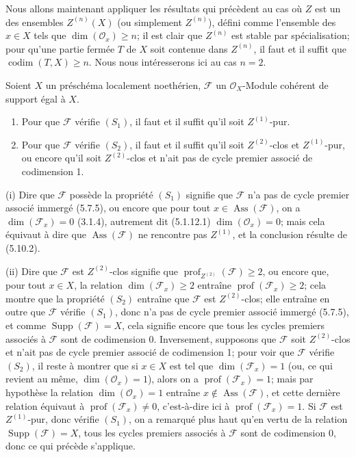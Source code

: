 \begin{env}[5.10.13]
\label{IV.2.s5.10.13-fr}
Nous allons maintenant appliquer les résultats qui précèdent au cas où $Z$ est
un des ensembles $Z^{(n)}(X)$ (ou simplement $Z^{(n)}$), défini comme
l'ensemble des $x\in X$ tels que $\dim(\mathcal O_x)\geq n$; il est clair que
$Z^{(n)}$ est stable par spécialisation; pour qu'une partie fermée $T$ de $X$
soit contenue dans $Z^{(n)}$, il faut et il suffit que
$\operatorname{codim}(T,X)\geq n$. Nous nous intéresserons ici au cas $n=2$.
\end{env}

\begin{proposition}[5.10.14]
\label{IV.2.s5.10.14-fr}
Soient $X$ un préschéma localement noethérien, $\mathcal F$ un
$\mathcal O_X$-Module cohérent de support égal à $X$.
\begin{enumerate}
\item[\textup{(i)}] Pour que $\mathcal F$ vérifie $(S_1)$, il faut et il suffit qu'il
soit $Z^{(1)}$-pur.
\item[\textup{(ii)}] Pour que $\mathcal F$ vérifie $(S_2)$, il faut et il suffit qu'il
soit $Z^{(2)}$-clos et $Z^{(1)}$-pur, ou encore qu'il soit $Z^{(2)}$-clos et
n'ait pas de cycle premier associé de codimension 1.
\end{enumerate}
\end{proposition}

(i) Dire que $\mathcal F$ possède la propriété $(S_1)$ signifie que
$\mathcal F$ n'a pas de cycle premier associé immergé (5.7.5), ou encore que
pour tout $x\in\operatorname{Ass}(\mathcal F)$, on a
$\dim(\mathcal F_x)=0$ (3.1.4), autrement dit (5.1.12.1)
$\dim(\mathcal O_x)=0$; mais cela équivaut à dire que
$\operatorname{Ass}(\mathcal F)$ ne rencontre pas $Z^{(1)}$, et la conclusion
résulte de (5.10.2).

(ii) Dire que $\mathcal F$ est $Z^{(2)}$-clos signifie que
$\operatorname{prof}_{Z^{(2)}}(\mathcal F)\geq2$, ou encore que, pour tout
$x\in X$, la relation $\dim(\mathcal F_x)\geq2$ entraîne
$\operatorname{prof}(\mathcal F_x)\geq2$; cela montre que la propriété $(S_2)$
entraîne que $\mathcal F$ est $Z^{(2)}$-clos; elle entraîne en outre que
$\mathcal F$ vérifie $(S_1)$, donc n'a pas de cycle premier associé immergé
(5.7.5), et comme $\operatorname{Supp}(\mathcal F)=X$, cela signifie encore
que tous les cycles premiers associés à $\mathcal F$ sont de codimension 0.
Inversement, supposons que $\mathcal F$ soit $Z^{(2)}$-clos et n'ait pas de
cycle premier associé de codimension 1; pour voir que $\mathcal F$ vérifie
$(S_2)$, il reste à montrer que si $x\in X$ est tel que
$\dim(\mathcal F_x)=1$ (ou, ce qui revient au même,
$\dim(\mathcal O_x)=1$), alors on a $\operatorname{prof}(\mathcal F_x)=1$;
mais par hypothèse la relation $\dim(\mathcal O_x)=1$ entraîne
$x\notin\operatorname{Ass}(\mathcal F)$, et cette dernière relation équivaut à
$\operatorname{prof}(\mathcal F_x)\neq0$, c'est-à-dire ici à
$\operatorname{prof}(\mathcal F_x)=1$. Si $\mathcal F$ est $Z^{(1)}$-pur,
donc vérifie $(S_1)$, on a remarqué plus haut qu'en vertu de la relation
$\operatorname{Supp}(\mathcal F)=X$, tous les cycles premiers associés à
$\mathcal F$ sont de codimension 0, donc ce qui précède s'applique.

